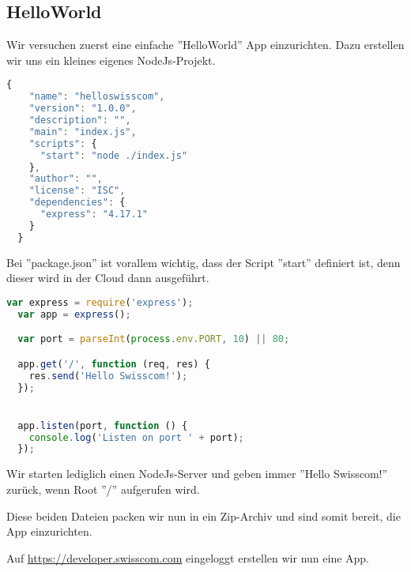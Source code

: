 \documentclass[11pt,titlepage]{article}
\begin{document}
\subsection{HelloWorld}
\label{sec:helloworld}

Wir versuchen zuerst eine einfache ''HelloWorld'' App einzurichten. Dazu erstellen wir uns ein kleines eigenes NodeJs-Projekt.

\begin{lstlisting}[language=JavaScript, caption=package.json, captionpos=t]
  {
    "name": "helloswisscom",
    "version": "1.0.0",
    "description": "",
    "main": "index.js",
    "scripts": {
      "start": "node ./index.js"
    },
    "author": "",
    "license": "ISC",
    "dependencies": {
      "express": "4.17.1"
    }
  }
\end{lstlisting}

Bei ''package.json'' ist vorallem wichtig, dass der Script ''start'' definiert ist, denn dieser wird in der Cloud dann ausgeführt. 

\begin{lstlisting}[language=JavaScript, caption=index.js, captionpos=t]
  var express = require('express');
  var app = express();

  var port = parseInt(process.env.PORT, 10) || 80;

  app.get('/', function (req, res) {
    res.send('Hello Swisscom!');
  });


  app.listen(port, function () {
    console.log('Listen on port ' + port);
  });
\end{lstlisting}

Wir starten lediglich einen NodeJs-Server und geben immer ''Hello Swisscom!'' zurück, wenn Root ''/'' aufgerufen wird.\par\medskip 
Diese beiden Dateien packen wir nun in ein Zip-Archiv und sind somit bereit, die App einzurichten.\par\medskip 

Auf \url{https://developer.swisscom.com} eingeloggt erstellen wir nun eine App.
\end{document}
